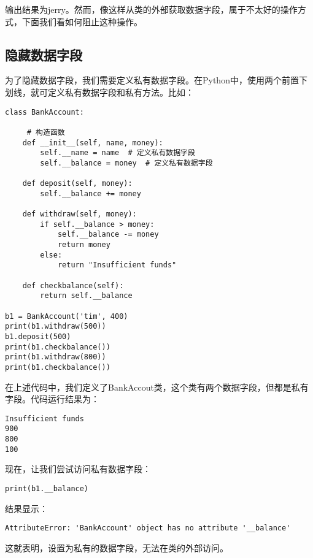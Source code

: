 输出结果为jerry。然而，像这样从类的外部获取数据字段，属于不太好的操作方式，下面我们看如何阻止这种操作。

\subsection{隐藏数据字段}
为了隐藏数据字段，我们需要定义私有数据字段。在Python中，使用两个前置下划线，就可定义私有数据字段和私有方法。比如：

\begin{lstlisting}
class BankAccount:

     # 构造函数
    def __init__(self, name, money):
        self.__name = name  # 定义私有数据字段
        self.__balance = money  # 定义私有数据字段

    def deposit(self, money):
        self.__balance += money

    def withdraw(self, money):
        if self.__balance > money:
            self.__balance -= money
            return money
        else:
            return "Insufficient funds"

    def checkbalance(self):
        return self.__balance

b1 = BankAccount('tim', 400)
print(b1.withdraw(500))
b1.deposit(500)
print(b1.checkbalance())
print(b1.withdraw(800))
print(b1.checkbalance())
\end{lstlisting}

在上述代码中，我们定义了BankAccout类，这个类有两个数据字段，但都是私有字段。代码运行结果为：

\begin{lstlisting}
Insufficient funds
900
800
100
\end{lstlisting}

现在，让我们尝试访问私有数据字段：

\begin{lstlisting}
print(b1.__balance)
\end{lstlisting}

结果显示：

\begin{lstlisting}
AttributeError: 'BankAccount' object has no attribute '__balance'
\end{lstlisting}

这就表明，设置为私有的数据字段，无法在类的外部访问。
